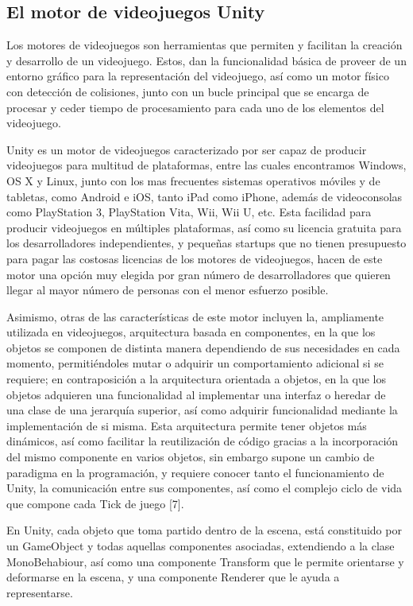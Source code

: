\subsection{El motor de videojuegos Unity}

Los motores de videojuegos son herramientas que permiten y facilitan la creación y desarrollo de un videojuego. Estos, dan la funcionalidad básica de proveer de un entorno gráfico para la representación del videojuego, así como un motor físico con detección de colisiones, junto con un bucle principal que se encarga de procesar y ceder tiempo de procesamiento para cada uno de los elementos del videojuego.

Unity es un motor de videojuegos caracterizado por ser capaz de producir videojuegos para multitud de plataformas, entre las cuales encontramos Windows, OS X y Linux, junto con los mas frecuentes sistemas operativos móviles y de tabletas, como Android e  iOS, tanto iPad como iPhone, además de videoconsolas como PlayStation 3, PlayStation Vita, Wii, Wii U, etc. Esta facilidad para producir videojuegos en múltiples plataformas, así como su licencia gratuita para los desarrolladores independientes, y pequeñas startups que no tienen presupuesto para pagar las costosas licencias de los motores de videojuegos, hacen de este motor una opción muy elegida por gran número de desarrolladores que quieren llegar al mayor número de personas con el menor esfuerzo posible.

Asimismo, otras de las características de este motor incluyen la, ampliamente utilizada en videojuegos, arquitectura basada en componentes, en la que los objetos se componen de distinta manera dependiendo de sus necesidades en cada momento, permitiéndoles mutar o adquirir un comportamiento adicional si se requiere; en contraposición a la arquitectura orientada a objetos, en la que los objetos adquieren una funcionalidad al implementar una interfaz o heredar de una clase de una jerarquía superior, así como adquirir funcionalidad mediante la implementación de si misma. Esta arquitectura permite tener objetos más dinámicos, así como facilitar la reutilización de código gracias a la incorporación del mismo componente en varios objetos, sin embargo supone un cambio de paradigma en la programación, y requiere conocer tanto el funcionamiento de Unity, la comunicación entre sus componentes, así como el complejo ciclo de vida que compone cada Tick de juego [7].

En Unity, cada objeto que toma partido dentro de la escena, está constituido por un GameObject y todas aquellas componentes asociadas, extendiendo a la clase MonoBehabiour, así como una componente Transform que le permite orientarse y deformarse en la escena, y una componente Renderer que le ayuda a representarse.

